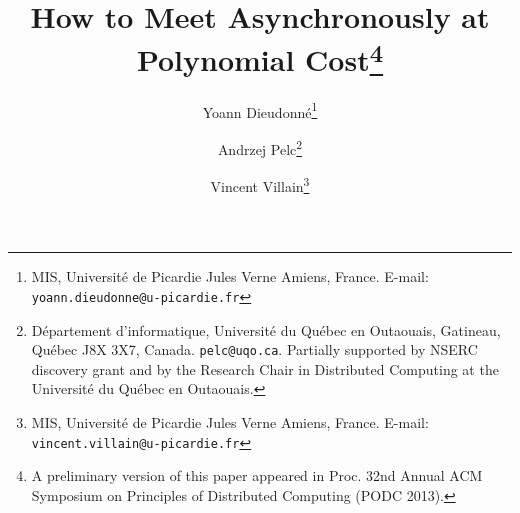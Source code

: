 \documentclass [11pt] {article}
\begin{document}
\title{{\bf  How to Meet Asynchronously at Polynomial Cost}\thanks{A preliminary version of this paper appeared in
Proc. 32nd Annual ACM Symposium on Principles of Distributed Computing (PODC 2013).} }

\author{
Yoann Dieudonn\'{e}\thanks{
MIS, Universit\'{e} de Picardie  Jules  Verne Amiens,  France. E-mail:  {\tt yoann.dieudonne@u-picardie.fr}}
 \and Andrzej Pelc\thanks{
 D\'epartement d'informatique, Universit\'e du Qu\'ebec en Outaouais, Gatineau,
Qu\'ebec J8X 3X7, Canada. {\tt pelc@uqo.ca}. Partially supported by NSERC discovery grant 
and by the Research Chair in Distributed Computing at the
Universit\'e du Qu\'ebec en Outaouais.}
\and  Vincent Villain\thanks{
MIS, Universit\'{e} de Picardie  Jules  Verne Amiens,  France. E-mail: {\tt vincent.villain@u-picardie.fr}}
}




\maketitle

\thispagestyle{empty}
\end{document}
